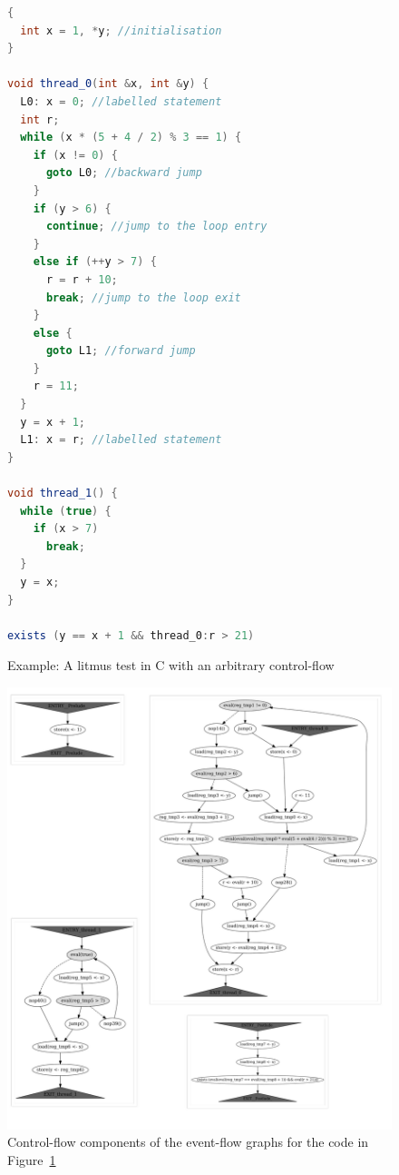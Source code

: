 \begin{figure}%
\centering
\begin{minipage}[t]{.5\textwidth}%
\begin{lstlisting}[language=Java]
{
  int x = 1, *y; //initialisation
}

void thread_0(int &x, int &y) {
  L0: x = 0; //labelled statement
  int r;
  while (x * (5 + 4 / 2) % 3 == 1) {
    if (x != 0) {
      goto L0; //backward jump
    }
    if (y > 6) {
      continue; //jump to the loop entry
    }
    else if (++y > 7) {
      r = r + 10;
      break; //jump to the loop exit
    }
    else {
      goto L1; //forward jump
    }
    r = 11;
  }
  y = x + 1;
  L1: x = r; //labelled statement
}

void thread_1() {
  while (true) {
    if (x > 7)
      break;
  }
  y = x;
}

exists (y == x + 1 && thread_0:r > 21)

\end{lstlisting}
\end{minipage}
\caption{Example: A litmus test in C with an arbitrary control-flow}
\label{ex:cfg-arbitrary}
\end{figure}


\begin{figure}[!h]
\includegraphics[width=\textwidth,keepaspectratio]{img/my/graphs/cfg-arbitrary/collage.jpg}
\caption{Control-flow components of the event-flow graphs for the code in Figure~\ref{ex:cfg-arbitrary}}
\label{ex:cfg-arbitrary:pic}
\end{figure}

